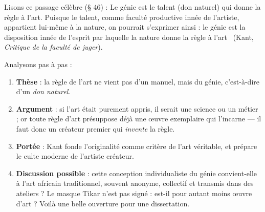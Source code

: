 \documentclass[11pt]{article}
\begin{document}
\begin{experience}
Lisons ce passage célèbre (§ 46) : \guillemotleft Le génie est le talent (don naturel) qui donne la règle à l'art. Puisque le talent, comme faculté productive innée de l'artiste, appartient lui-même à la nature, on pourrait s'exprimer ainsi : le génie est la disposition innée de l'esprit par laquelle la nature donne la règle à l'art \guillemotright\ (Kant, \emph{Critique de la faculté de juger}).

Analysons pas à pas :
\begin{enumerate}
\item \textbf{Thèse} : la règle de l'art ne vient pas d'un manuel, mais du génie, c'est-à-dire d'un \emph{don naturel}.
\item \textbf{Argument} : si l'art était purement appris, il serait une science ou un métier ; or toute règle d'art présuppose déjà une œuvre exemplaire qui l'incarne — il faut donc un créateur premier qui \emph{invente} la règle.
\item \textbf{Portée} : Kant fonde l'originalité comme critère de l'art véritable, et prépare le culte moderne de l'artiste créateur.
\item \textbf{Discussion possible} : cette conception individualiste du génie convient-elle à l'art africain traditionnel, souvent anonyme, collectif et transmis dans des ateliers ? Le masque Tikar n'est pas signé : est-il pour autant moins œuvre d'art ? Voilà une belle ouverture pour une dissertation.
\end{enumerate}
\end{experience}
\end{document}
